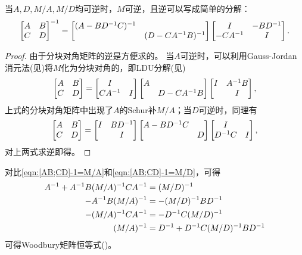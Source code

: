 \begin{theorem}
	\tcblower 
	当$A,D,M/A,M/D$均可逆时，$M$可逆，且逆可以写成简单的分解：
	\begin{eqnarray}
		\begin{bmatrix}
			A&B\\C&D
		\end{bmatrix}^{-1}=\begin{bmatrix}
			(A-BD^{-1} C)^{-1}\\ &(D-CA^{-1} B)^{-1}
		\end{bmatrix}\begin{bmatrix}
			I&-BD^{-1}\\-CA^{-1}&I
		\end{bmatrix}.
	\end{eqnarray}
\end{theorem}

\begin{proof}
	由于分块对角矩阵的逆是方便求的。
	当$A$可逆时，可以利用Gauss-Jordan消元法(见)将$M$化为分块对角的，即LDU分解(见)
	\[
		\begin{bmatrix}
			A&B\\C&D
		\end{bmatrix}=\begin{bmatrix}
			I\\CA^{-1}&I
		\end{bmatrix}\begin{bmatrix}
			A\\ &D-CA^{-1} B
		\end{bmatrix}\begin{bmatrix}
			I&A^{-1} B\\ &I
		\end{bmatrix},
	\]
	上式的分块对角矩阵中出现了$A$的Schur补$M/A$；当$D$可逆时，同理有
	\[
		\begin{bmatrix}
			A&B\\C&D
		\end{bmatrix}=\begin{bmatrix}
			I&BD^{-1}\\ &I
		\end{bmatrix}\begin{bmatrix}
			A-BD^{-1} C\\ &D
		\end{bmatrix}\begin{bmatrix}
			I\\D^{-1} C&I
		\end{bmatrix},
	\]
	对上两式求逆即得。
\end{proof}

\begin{corollary}
	对比\eqref{eqn:[AB;CD]-1=M/A}和\eqref{eqn:[AB;CD]-1=M/D}，可得
	\begin{subequations}
		\begin{align}
			A^{-1}+A^{-1} B(M/A)^{-1} CA^{-1}&=(M/D)^{-1}\\
			-A^{-1} B(M/A)^{-1}&=-(M/D)^{-1} BD^{-1}\\
			-(M/A)^{-1} CA^{-1}&=-D^{-1} C(M/D)^{-1}\\
			(M/A)^{-1}&=D^{-1}+D^{-1} C(M/D)^{-1} BD^{-1}
		\end{align}
	\end{subequations}
	可得Woodbury矩阵恒等式()。
\end{corollary}

